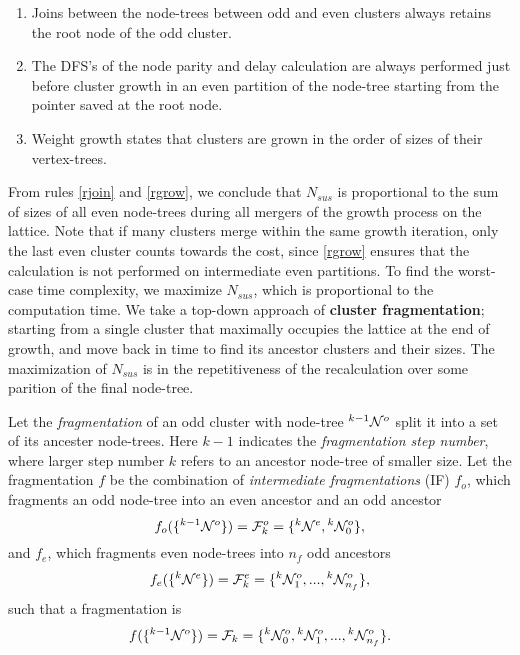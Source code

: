 \begin{enumerate}[label=\textbf{R\arabic*},ref=R\arabic*]
  \item Joins between the node-trees between odd and even clusters always retains the root node of the odd cluster. \label{rjoin}
  \item The DFS's of the node parity and delay calculation are always performed just before cluster growth in an even partition of the node-tree starting from the pointer saved at the root node. \label{rgrow}
  \item Weight growth states that clusters are grown in the order of sizes of their vertex-trees. \label{rweight}
\end{enumerate}
From rules \ref{rjoin} and \ref{rgrow}, we conclude that $N_{sus}$ is proportional to the sum of sizes of all even node-trees during all mergers of the growth process on the lattice. Note that if many clusters merge within the same growth iteration, only the last even cluster counts towards the cost, since \ref{rgrow} ensures that the calculation is not performed on intermediate even partitions. To find the worst-case time complexity, we maximize $N_{sus}$, which is proportional to the computation time. We take a top-down approach of \textbf{cluster fragmentation}; starting from a single cluster that maximally occupies the lattice at the end of growth, and move back in time to find its ancestor clusters and their sizes. The maximization of $N_{sus}$ is in the repetitiveness of the recalculation over some parition of the final node-tree. 

\begin{definition}\label{def:fragmentation}
  Let the \emph{fragmentation} of an odd cluster with node-tree ${}^{k-1}\mathcal{N}^o$ split it into a set of its ancester node-trees. Here $k-1$ indicates the \emph{fragmentation step number}, where larger step number $k$ refers to an ancestor node-tree of smaller size. Let the fragmentation $f$ be the combination of \emph{intermediate fragmentations} (IF) $f_o$, which fragments an odd node-tree into an even ancestor and an odd ancestor
  \begin{equation}\label{eq:pfo}
    f_o(\{\pre{k-1}\nset^o\}) = \m{F}^o_k = \{\pre{k}\nset^e, \pre{k}\nset^o_0 \}, 
  \end{equation}
  and $f_e$, which fragments even node-trees into $n_f$ odd ancestors
  \begin{equation}\label{eq:pfe}
    f_e(\{\pre{k}\nset^e\}) = \m{F}^e_k=\{\pre{k}\nset^{o}_1,...,\pre{k}\nset^o_{n_f}\},
  \end{equation}
  such that a fragmentation is
  \begin{equation}\label{eq:fstep}
    f(\{\pre{k-1}\nset^o\}) = \m{F}_k = \{\pre{k}\nset^o_0,\pre{k}\nset^{o}_1,...,\pre{k}\nset^{o}_{n_f}\}.
  \end{equation}
\end{definition}

